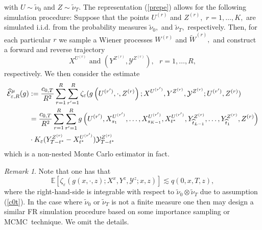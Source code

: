 \documentclass[a4paper,11pt]{amsart}
\theoremstyle{plain}
\theoremstyle{remark}
\newtheorem{remark}[theorem]{Remark}
\begin{document}
with $U\sim\widetilde{\nu}_{0}$ and $Z\sim\widetilde{\nu}_{T}.$ The
representation (\ref{prepe}) allows for the following simulation procedure:
Suppose that the points $U^{(r)}$ and $Z^{(r)},$ $r=1,\ldots,K,$ are simulated
i.i.d. from the probability measures $\widetilde{\nu}_{0},$ and
$\widetilde{\nu}_{T},$ respectively. Then, for each particular $r$ we sample a
Wiener processes $W^{(r)}$ and $\widetilde{W}^{(r)},$ and construct a forward
and reverse trajectory%
\[
X^{U^{(r)}}\text{ \ \ and \ \ }\left(  Y^{Z^{(r)}},\mathcal{Y}^{Z^{(r)}%
}\right)  ,\text{ \ \ }r=1,\ldots,R,
\]
respectively. We then consider the estimate%
\begin{align}
\widehat{\mathcal{E}}_{\varepsilon,R}^{\mu}(g)  &  :=\frac{c_{0,T}}{R^{2}}%
\sum_{r=1}^{R}\sum_{r^{\prime}=1}^{R}\zeta_{\varepsilon}(g\left(
U^{(r^{\prime})},\cdot,Z^{(r)}\right)  ;X^{U^{(r^{\prime})}},Y^{Z^{(r)}%
},\mathcal{Y}^{Z^{(r)}};U^{(r^{\prime})},Z^{(r)})\notag\\
&  =\frac{c_{0,T}}{R^{2}}\sum_{r=1}^{R}\sum_{r^{\prime}=1}^{R}g\left(
U^{(r^{\prime})},X_{s_{1}}^{U^{(r^{\prime})}},\ldots,X_{s_{K-1}}%
^{U^{(r^{\prime})}},X_{t^{\ast}}^{U^{(r^{\prime})}},Y_{\widehat{t}_{L-1}%
}^{Z^{(r)}},\ldots,Y_{\widehat{t}_{1}}^{Z^{(r)}},Z^{(r)}\right) \notag\\
&  \cdot K_{\varepsilon}(Y_{T-t^{\ast}}^{Z^{(r)}}-X_{t^{\ast}}^{U^{(r^{\prime
})}})\mathcal{Y}_{T-t^{\ast}}^{Z^{(r)}} \label{non_nest_est}%
\end{align}
which is a non-nested Monte Carlo estimator in fact.

\begin{remark}
Note that one has that%
\[
\mathbb{E}\left[  \zeta_{\varepsilon}(g\left(  x,\cdot,z\right)  ;X^{x}%
,Y^{z},\mathcal{Y}^{z};x,z)\right]  \lesssim q(0,x,T,z),
\]
where the right-hand-side is integrable with respect to $\widetilde{\nu}%
_{0}\otimes\widetilde{\nu}_{T}$ due to assumption (\ref{c0t}). In the case
where $\widetilde{\nu}_{0}$ or $\widetilde{\nu}_{T}$ is not a finite measure
one then may design a similar FR simulation procedure based on some importance
sampling or MCMC\ technique. We omit the details.
\end{remark}
\end{document}
